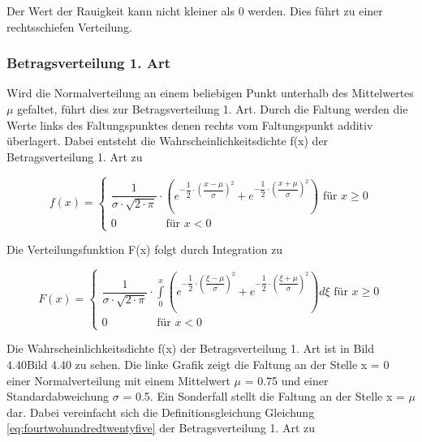 \noindent Der Wert der Rauigkeit kann nicht kleiner als 0 werden. Dies f\"{u}hrt zu einer rechtsschiefen Verteilung.

\subsubsection{Betragsverteilung 1. Art}

\noindent Wird die Normalverteilung an einem beliebigen Punkt unterhalb des Mittelwertes $\mu$ gefaltet, f\"{u}hrt dies zur Betragsverteilung 1. Art. Durch die Faltung werden die Werte links des Faltungspunktes denen rechts vom Faltungspunkt additiv \"{u}berlagert. Dabei entsteht die Wahrscheinlichkeitsdichte f(x) der Betragsverteilung 1. Art zu

\begin{equation}\label{eq:fourtwohundredtwentyfive}
f(x)=\left\{\begin{array}{c} {\dfrac{1}{\sigma \cdot \sqrt{2\cdot \pi}} \cdot \left(e^{-\dfrac{1}{2} \cdot \left(\dfrac{x-\mu}{\sigma} \right)^{2}} +e^{-\dfrac{1}{2} \cdot \left(\dfrac{x+\mu }{\sigma} \right)^{2}} \right)\text{ für } x\ge 0} \\ 
{0 \qquad \qquad \text{ für } x<0} \end{array}\right.
\end{equation}

\noindent Die Verteilungsfunktion F(x) folgt durch Integration zu

\begin{equation}\label{eq:fourtwohundredtwentysix}
F\left(x\right)=\left\{\begin{array}{c} {\dfrac{1}{\sigma \cdot \sqrt{2\cdot \pi } } \cdot \int\limits _{0}^{x}\left(e^{-\dfrac{1}{2} \cdot \left(\dfrac{\xi -\mu }{\sigma } \right)^{2} } +e^{-\dfrac{1}{2} \cdot \left(\dfrac{\xi +\mu }{\sigma } \right)^{2} } \right) d\xi \text{ für } x\ge 0} \\ 
{0 \qquad \qquad \text{ für } x<0} \end{array}\right.
\end{equation}

\noindent Die Wahrscheinlichkeitsdichte f(x) der Betragsverteilung 1. Art ist in Bild 4.40Bild 4.40 zu sehen. Die linke Grafik zeigt die Faltung an der Stelle x = 0 einer Normalverteilung mit einem Mittelwert $\mu$ = 0.75 und einer Standardabweichung $\sigma$ = 0.5. Ein Sonderfall stellt die Faltung an der Stelle x = $\mu$ dar. Dabei vereinfacht sich die Definitionsgleichung Gleichung \eqref{eq:fourtwohundredtwentyfive} der Betragsverteilung 1. Art zu

